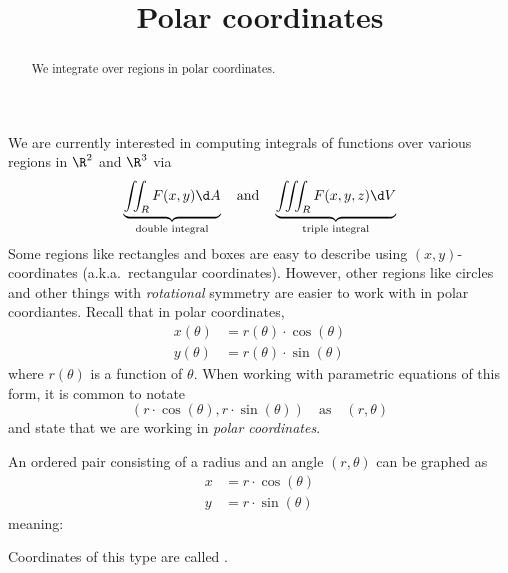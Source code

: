 \documentclass{ximera}
\title[Dig-In:]{Polar coordinates}
\begin{document}
\begin{abstract}
  We integrate over regions in polar coordinates.
\end{abstract}
\maketitle

We are currently interested in computing integrals of functions over
various regions in $\R^2$ and $\R^3$ via
\[
\underbrace{\iint_R F(x,y) \d A}_{\text{double integral}} \quad\text{and}\quad \underbrace{\iiint_R F(x,y,z) \d V}_{\text{triple integral}}
\]
Some regions like rectangles and boxes are easy to describe using
$(x,y)$-coordinates (a.k.a.\ rectangular coordinates). However, other
regions like circles and other things with \textit{rotational}
symmetry are easier to work with in polar coordiantes. Recall that in
polar coordinates,
\begin{align*} 
  x(\theta) &= r(\theta) \cdot \cos(\theta)\\
  y(\theta) &= r(\theta) \cdot \sin(\theta)
\end{align*}
where $r(\theta)$ is a function of $\theta$.  When working with
parametric equations of this form, it is common to notate
\[
(r \cdot \cos(\theta), r\cdot \sin(\theta)) \quad\text{as}\quad (r,\theta)
\]
and state that we are working in \textit{polar coordinates}.

\begin{definition}
  An ordered pair consisting of a radius and an angle $(r,\theta)$
  can be graphed as
  \begin{align*}
    x &= r\cdot \cos(\theta)\\
    y &= r\cdot \sin(\theta)
  \end{align*}
  meaning:
  \begin{image}[2in]
  \end{image}
  Coordinates of this type are called .
\end{definition}
\end{document}
